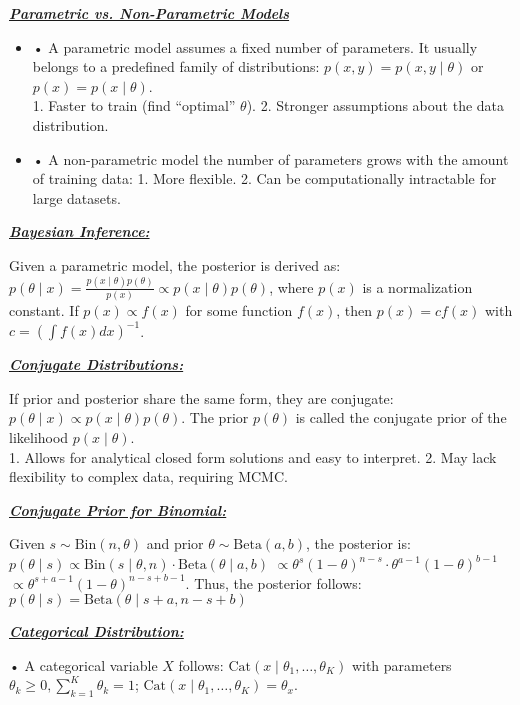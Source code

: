 \documentclass[10pt]{article}
\newcommand{\bulletPoint}[1]{\ul{\textit{\textbf{#1}}}}
\begin{document}
\begin{multicols*}{3}
\begin{itemize}[label=$\cdot$,leftmargin=0pt]
\end{itemize}
\bulletPoint{Parametric vs. Non-Parametric Models}

\begin{itemize}[leftmargin=0pt]
\item • A parametric model assumes a fixed number of parameters. It usually belongs to a predefined family of distributions: 
\( p(x,y) = p(x,y \mid \theta) \) or \( p(x) = p(x \mid \theta) \). \\
 1. Faster to train (find “optimal” \( \theta \)). 2. Stronger assumptions about the data distribution. 
\item • A non-parametric model the number of parameters grows with the amount of training data:
  1. More flexible.
  2. Can be computationally intractable for large datasets.
\end{itemize}

\bulletPoint{Bayesian Inference:} \quad

Given a parametric model, the posterior is derived as: $p(\theta \mid x) = \frac{p(x \mid \theta) p(\theta)}{p(x)} \propto p(x \mid \theta) p(\theta)$,
where $p(x)$ is a normalization constant.
If $p(x) \propto f(x)$ for some function $f(x)$, then $p(x) = c f(x)$ with 
$c = \left( \int f(x) dx \right)^{-1}$.

\bulletPoint{Conjugate Distributions:} \quad

If prior and posterior share the same form, they are conjugate:
$p(\theta \mid x) \propto p(x \mid \theta) p(\theta)$.
The prior $p(\theta)$ is called the conjugate prior of the likelihood $p(x \mid \theta)$.\\
1. Allows for analytical closed form solutions and easy to interpret. 
2. May lack flexibility to complex data, requiring MCMC.


\bulletPoint{Conjugate Prior for Binomial:} \quad

Given $s \sim \text{Bin}(n, \theta)$ and prior $\theta \sim \text{Beta}(a, b)$, the posterior is:
$p(\theta \mid s) \propto \text{Bin}(s \mid \theta, n) \cdot \text{Beta}(\theta \mid a, b)$
$\propto \theta^s (1 - \theta)^{n-s} \cdot \theta^{a-1} (1 - \theta)^{b-1}$
$\propto \theta^{s+a-1} (1 - \theta)^{n-s+b-1}$. 
Thus, the posterior follows:
$p(\theta \mid s) = \text{Beta}(\theta \mid s + a, n - s + b)$

\bulletPoint{Categorical Distribution:} \quad

• A categorical variable $X$ follows:
$\text{Cat} (x \mid \theta_1, \dots, \theta_K)$ with parameters $\theta_k \geq 0, \sum_{k=1}^{K} \theta_k = 1$;
$\text{Cat} (x \mid \theta_1, \dots, \theta_K)=\theta_x$.


\end{multicols*}
\end{document}
